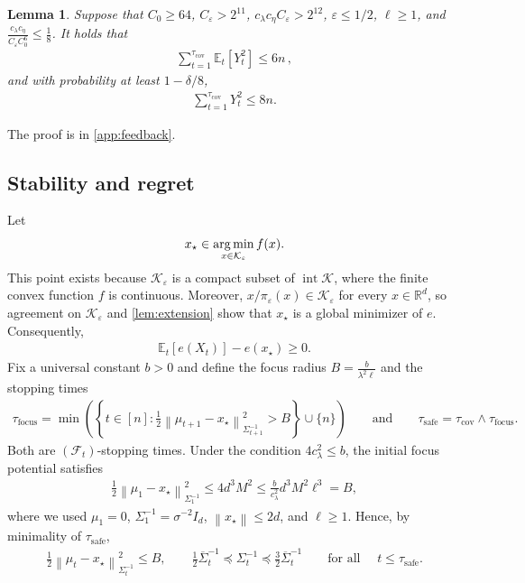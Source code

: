 \documentclass[11pt]{article}
\newtheorem{lemma}[lemma]{Lemma}
\newcommand{\R}{\mathbb R}
\newcommand{\E}{\mathbb E}
\newcommand{\K}{\mathcal K}
\newcommand{\F}{\mathcal F}
\newcommand{\argmin}{\operatornamewithlimits{arg\,min}}
\newcommand{\1}{\mathbf 1}
\newcommand{\eps}{\varepsilon}
\newcommand{\norm}[1]{\left\lVert #1\right\rVert}
\newcommand{\normm}[2]{\left\lVert #1\right\rVert_{#2}}
\begin{document}
\begin{lemma}
    \label{lem:feedback}
    Suppose that $C_0\geq 64$, $C_\eps> 2^{11}$, $c_\lambda c_\eta C_\eps> 2^{12}$, $\eps\leq 1/2$,
    $\ell\geq 1$, and $\frac{c_\lambda c_\eta}{C_\eps C_0^6}\leq\frac{1}{8}$.
    It holds that
    \begin{align}
        \sum_{t=1}^{\tau_{\mathrm{cov}}}\E_t[Y_t^2]\leq 6n\,,
        \label{eq:predictable-Y2}
    \end{align}
    and with probability at least $1-\delta/8$,
    \begin{align}
        \sum_{t=1}^{\tau_{\mathrm{cov}}}Y_t^2 \leq 8n.
        \label{eq:realised-Y2}
    \end{align}
\end{lemma}

The proof is in \cref{app:feedback}.

\subsection{Stability and regret}
\label{sec:stability}

Let
\begin{align}
    x_\star\in\argmin_{x\in\K_\eps}f(x).
    \label{eq:xstar}
\end{align}
This point exists because $\K_\eps$ is a compact subset of
$\operatorname{int}\K$, where the finite convex function $f$ is continuous.
Moreover, $x/\pi_\eps(x)\in\K_\eps$ for every $x\in\R^d$, so agreement on
$\K_\eps$ and \eqref{lem:extension} show that $x_\star$ is a global
minimizer of $e$.  Consequently,
\begin{align}
    \E_t[e(X_t)]-e(x_\star)\geq0.
    \label{eq:stationarity-sign}
\end{align}
Fix a universal constant $b>0$ and define the focus radius
$B=\frac{b}{\lambda^2\ell}$
and the stopping times
\begin{align}
    \tau_{\mathrm{focus}}
    =
    \min\left(
    \left\{
    t\in[n]:
    \frac12
    \normm{\mu_{t+1}-x_\star}{\Sigma_{t+1}^{-1}}^2>B
    \right\}
    \cup\{n\}
    \right)
    \qquad\text{and}\qquad
    \tau_{\mathrm{safe}}
    =
    \tau_{\mathrm{cov}}\wedge\tau_{\mathrm{focus}}.
    \label{eq:safe-stopping-time}
\end{align}
Both are $(\F_t)$-stopping times.
Under the condition $4c_\lambda^2\leq b$, the initial focus potential satisfies
\begin{align}
    \frac12\normm{\mu_1-x_\star}{\Sigma_1^{-1}}^2
    \leq
    4d^3M^2
    \leq
    \frac{b}{c_\lambda^2}d^3M^2\ell^3
    =B,
    \label{eq:initial-focus}
\end{align}
where we used $\mu_1=0$, $\Sigma_1^{-1}=\sigma^{-2}I_d$,
$\norm{x_\star}\leq2d$, and $\ell\geq1$.
Hence, by minimality of $\tau_{\mathrm{safe}}$,
\begin{align}
    \frac12\normm{\mu_t-x_\star}{\Sigma_t^{-1}}^2
    \leq B,
    \qquad
    \frac12\overline\Sigma_t^{-1}
    \preceq\Sigma_t^{-1}
    \preceq\frac32\overline\Sigma_t^{-1}
    \qquad
    \text{for all }\quad
    t\leq\tau_{\mathrm{safe}}.
    \label{eq:stability-stopped-invariants}
\end{align}
\end{document}
